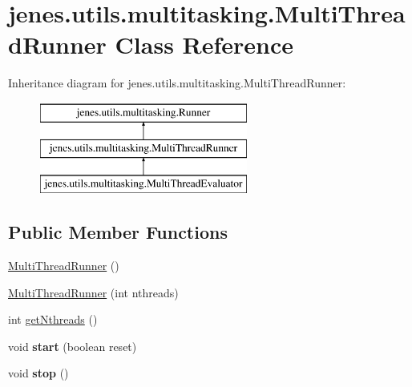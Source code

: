 \hypertarget{classjenes_1_1utils_1_1multitasking_1_1_multi_thread_runner}{\section{jenes.\-utils.\-multitasking.\-Multi\-Thread\-Runner Class Reference}
\label{classjenes_1_1utils_1_1multitasking_1_1_multi_thread_runner}
}
Inheritance diagram for jenes.\-utils.\-multitasking.\-Multi\-Thread\-Runner\-:\begin{figure}[H]
\begin{center}
\leavevmode
\includegraphics[height=3.000000cm]{classjenes_1_1utils_1_1multitasking_1_1_multi_thread_runner}
\end{center}
\end{figure}
\subsection*{Public Member Functions}
\begin{DoxyCompactItemize}
\item 
\hyperlink{classjenes_1_1utils_1_1multitasking_1_1_multi_thread_runner_ab0815486f3159f086cd06ccab94df319}{Multi\-Thread\-Runner} ()
\item 
\hyperlink{classjenes_1_1utils_1_1multitasking_1_1_multi_thread_runner_a6319362b08c06d8bf26989407d223c31}{Multi\-Thread\-Runner} (int nthreads)
\item 
int \hyperlink{classjenes_1_1utils_1_1multitasking_1_1_multi_thread_runner_a69370630a898026070fe8e806cec8fe0}{get\-Nthreads} ()
\item 
\hypertarget{classjenes_1_1utils_1_1multitasking_1_1_multi_thread_runner_a52fc59a28c3187e84b871b9b823b7f43}{void {\bfseries start} (boolean reset)}\label{classjenes_1_1utils_1_1multitasking_1_1_multi_thread_runner_a52fc59a28c3187e84b871b9b823b7f43}

\item 
\hypertarget{classjenes_1_1utils_1_1multitasking_1_1_multi_thread_runner_a5f00a9b63ff1322d586ad62ec060d597}{void {\bfseries stop} ()}\label{classjenes_1_1utils_1_1multitasking_1_1_multi_thread_runner_a5f00a9b63ff1322d586ad62ec060d597}

\end{DoxyCompactItemize}
